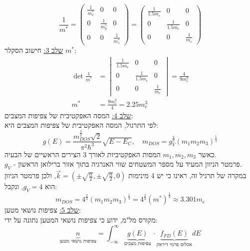 \documentclass{article}
\begin{document}
\begin{Answer}
\begin{equation*}
    \frac{1}{m^{*}}=\begin{pmatrix}
        \frac{1}{m_{x}^{*}} & 0 & 0\\
        0 & \frac{1}{m_{y}^{*}} & 0\\
        0 & 0 & \frac{1}{m_{z}^{*}}
    \end{pmatrix}= \begin{pmatrix}
        \frac{1}{1.5m_{e}} & 0 & 0\\
        0 & \frac{1}{1.5m_{e}} & 0\\
        0 & 0 & \frac{1}{m_{e}}
    \end{pmatrix}
\end{equation*}
\underline{שלב 3:} חישוב הסקלר $m^{*}$:
\begin{align*}
    \det{\frac{1}{m^{*}}}&=\begin{vmatrix}
        \frac{1}{1.5m_{e}} & 0 & 0\\
        0 & \frac{1}{1.5m_{e}} & 0\\
        0 & 0 & \frac{1}{m_{e}}
    \end{vmatrix} = \frac{4}{9 m_{e}^{3}}\\
    m^{*}&=\frac{9 m_{e}^{3}}{4}=2.25m_{e}^{3}
\end{align*}
\underline{שלב 4:} המסה האפקטיבית של צפיפות המצבים:\\
לפי התרגול, המסה האפקטיבית של צפיפות המצבים היא:
\begin{equation}\label{המסה האפקטיבית של צפיפות מצבים}
    g(E)=\frac{m_{DOS}^{\frac{3}{2}}\sqrt{2}}{\pi^{2}\hbar^{3}}\sqrt{E-E_{C}},\quad m_{DOS}=g_{V}^{\frac{2}{3}}\left( m_{1}m_{2}m_{3} \right)^{\frac{1}{3}}
\end{equation}
כאשר $m_{1},m_{2},m_{3}$ המסות האפקטיביות לאורך 3 הצירים הראשיים של הבעיה.\\
$g_{V}$ - פרמטר הניוון המעיד על מספר המשטחים שווי האנרגיה בתוך אזור ברילואן הראשון.\\
במקרה של תרגיל זה, ראינו כי יש 4 מינימות $\vec{k}=\left( \pm\sqrt{\frac{\alpha}{2}},\pm\sqrt{\frac{\alpha}{2}},0 \right)$, ולכן פרמטר הניוון הוא $g_{V}=4$, ונקבל:
$$m_{DOS}=4^{\frac{2}{3}}\left( m_{1}m_{2}m_{3} \right)^{\frac{1}{3}}=4^{\frac{2}{3}}\left( m^{*} \right)^{\frac{1}{3}}\approx3.301m_{e}$$
\underline{שלב 5:} צפיפות נושאי מטען:\\
מקורס מל"מ, ידוע כי צפיפות נושאי המטען נתונה על ידי:
\begin{equation}\label{צפיפות נושאי מטען}
    \underbrace{n}_{\text{צפיפות נושאי מטען}}=\int_{-\infty}^{\infty}\underbrace{g(E)}_{\text{צפיפות מצבים}}\,\cdot\underbrace{f_{FD}{(E)}}_{\text{אכלוס פרמי דיראק}}dE

\end{equation}
\end{Answer}
\end{document}
